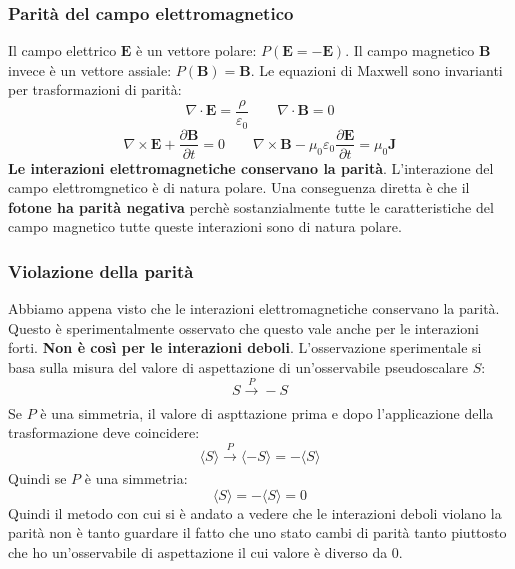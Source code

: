 \subsubsection{Parità del campo elettromagnetico}
Il campo elettrico $\mathbf{E}$ è un vettore polare: $P(\mathbf{E}=-\mathbf{E})$. Il campo magnetico $\mathbf{B}$ invece è un vettore assiale: $P(\mathbf{B})=\mathbf{B}$. Le equazioni di Maxwell sono invarianti per trasformazioni di parità:
\begin{equation*}
    \nabla \cdot \mathbf{E}=\frac{\rho}{\varepsilon_0} \qquad  \nabla \cdot \mathbf{B}=0
\end{equation*}
\begin{equation*}
    \nabla \times \mathbf{E}+\frac{\partial \mathbf{B}}{\partial t}=0 \qquad \nabla \times \mathbf{B}-\mu_0 \varepsilon_0 \frac{\partial \mathbf{E}}{\partial t}=\mu_0 \mathbf{J}
\end{equation*}
\textbf{Le interazioni elettromagnetiche conservano la parità}. L'interazione del campo elettromgnetico è di natura polare. Una conseguenza diretta è che il \textbf{fotone ha parità negativa} perchè sostanzialmente tutte le caratteristiche del campo magnetico tutte queste interazioni sono di natura polare.
\subsubsection{Violazione della parità}
Abbiamo appena visto che le interazioni elettromagnetiche conservano la parità. Questo è sperimentalmente osservato che questo vale anche per le interazioni forti. \textbf{Non è così per le interazioni deboli}. L'osservazione sperimentale si basa sulla misura del valore di aspettazione di un'osservabile pseudoscalare $S$:
\begin{equation*}
    S\xrightarrow[]{P}-S
\end{equation*}
Se $P$ è una simmetria, il valore di aspttazione prima e dopo l'applicazione della trasformazione deve coincidere:
\begin{equation*}
    \langle S \rangle \xrightarrow[]{P}\langle -S \rangle=-\langle S \rangle
\end{equation*}
Quindi se $P$ è una simmetria:
\begin{equation*}
    \langle S \rangle=-\langle S \rangle=0
\end{equation*}
Quindi il metodo con cui si è andato a vedere che le interazioni deboli violano la parità non è tanto guardare il fatto che uno stato cambi di parità tanto piuttosto che ho un'osservabile di aspettazione il cui valore è diverso da $0$.
